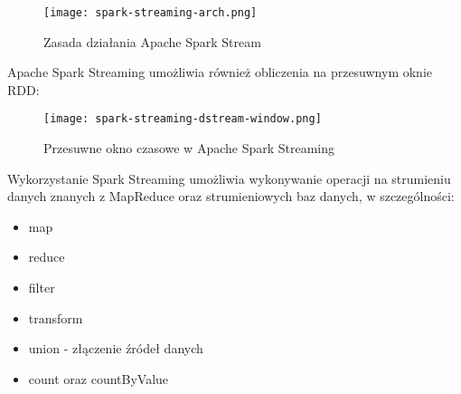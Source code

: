 \begin{figure}[h!]
\centering
\texttt{[image: spark-streaming-arch.png]}
\caption{Zasada działania Apache Spark Stream}
\label{fig:spark-streaming-arch}
\end{figure}

Apache Spark Streaming umożliwia również obliczenia na przesuwnym oknie RDD:

\begin{figure}[h!]
\centering
\texttt{[image: spark-streaming-dstream-window.png]}
\caption{Przesuwne okno czasowe w Apache Spark Streaming}
\label{fig:spark-streaming-dstream-window}
\end{figure}

Wykorzystanie Spark Streaming umożliwia wykonywanie operacji na strumieniu danych znanych z MapReduce oraz strumieniowych baz danych, w szczególności:

\begin{itemize}[noitemsep]
\item map
\item reduce
\item filter
\item transform
\item union - złączenie źródeł danych
\item count oraz countByValue
\end{itemize}

